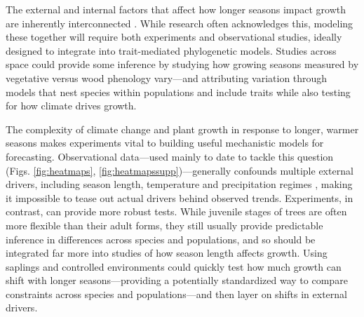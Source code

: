 \documentclass[11pt]{article}
\newcommand{\R}[1]{\label{#1}\linelabel{#1}}
\begin{document}

\R{R3complaint1S}The external and internal factors that affect how longer seasons impact growth are inherently interconnected \citep{nobel1983biophysical}. While research often acknowledges this, modeling these together will require both experiments and observational studies, ideally designed to integrate into trait-mediated phylogenetic models. Studies across space could provide some inference by studying how growing seasons measured by vegetative versus wood phenology vary---and attributing variation through models that nest species within populations and include traits while also testing for how climate drives growth.  


The complexity of climate change and plant growth in response to longer, warmer seasons makes experiments vital to building useful mechanistic models for forecasting. Observational data---used mainly to date to tackle this question (Figs. \ref{fig:heatmaps}, \ref{fig:heatmapssupp})---generally confounds multiple external drivers, including season length, temperature and precipitation regimes \citep{ren2019,ipcc2021,camarero2022decoupled}, making it impossible to tease out actual drivers behind observed trends. \R{R3complaint5S1}Experiments, in contrast, can provide more robust tests. While juvenile stages of trees are often more flexible than their adult forms, they still usually provide predictable inference in differences across species and populations, and so should be integrated far more into studies of how season length affects growth. Using saplings and controlled environments could quickly test how much growth can shift with longer seasons---providing a potentially standardized way to compare constraints across species and populations---and then layer on shifts in external drivers. %
\end{document}
